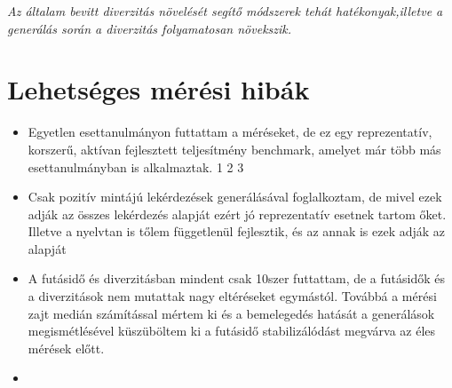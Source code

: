 \textit{Az általam bevitt diverzitás növelését segítő módszerek tehát hatékonyak,illetve a generálás során a diverzitás folyamatosan növekszik.}


\section{Lehetséges mérési hibák}
\begin{itemize}
	\item Egyetlen esettanulmányon futtattam a méréseket, de ez egy reprezentatív, korszerű, aktívan fejlesztett teljesítmény benchmark, amelyet már több más esettanulmányban is alkalmaztak.\cite{} 1 2 3
	\item Csak pozitív mintájú lekérdezések generálásával foglalkoztam, de mivel ezek adják az összes lekérdezés alapját ezért jó reprezentatív esetnek tartom őket. Illetve a nyelvtan is tőlem függetlenül fejlesztik, és az annak is ezek adják az alapját
	\item A futásidő és diverzitásban mindent csak 10szer futtattam, de a futásidők és a diverzitások nem mutattak nagy eltéréseket egymástól. Továbbá a mérési zajt medián számítással mértem ki és a bemelegedés hatását a generálások megismétlésével küszüböltem ki a futásidő stabilizálódást megvárva az éles mérések előtt.
	\item 
	
\end{itemize}




